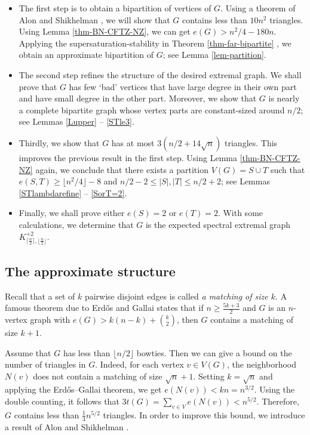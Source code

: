\documentclass[11pt]{article}
\begin{document}
\begin{itemize}

\item[\ding{172}]
The first step is to obtain a bipartition of  vertices of $G$. 
Using a theorem of Alon and Shikhelman \cite{AS2016}, 
we will show that $G$ 
contains less than $10n^{2}$ triangles. 
Using Lemma \ref{thm-BN-CFTZ-NZ}, 
we can get $e(G) > {n^2}/{4} - 180n$. 
Applying the supersaturation-stability in Theorem \ref{thm-far-bipartite} , 
we obtain an approximate bipartition of $G$; see Lemma \ref{lem-partition}. 


\item[\ding{173}]
The second step refines the structure of 
the desired extremal graph. 
We shall prove that $G$ has  few `bad' vertices that have large degree in their own part and have small degree in the other part.    
Moreover, we show 
 that $G$ is nearly a complete bipartite graph whose vertex parts are constant-sized around ${n}/{2}$; see Lemmas \ref{Lupper} --  \ref{STle3}. 


\item[\ding{174}] 
Thirdly, we show that $G$ has at most 
$3({n}/{2} + 14\sqrt{n})$ triangles. 
This improves the previous result in the first step. 
Using Lemma \ref{thm-BN-CFTZ-NZ} again,  
we conclude that there exists a partition $V(G)=S\cup T$ such that 
$e(S,T)\ge \lfloor n^2/4\rfloor -8$ and ${n}/{2} -2 \le 
|S|, |T| \le {n}/{2} +2$; see Lemmas \ref{STlambdarefine} --  \ref{SorT=2}. 

\item[\ding{175}]
Finally, 
we shall prove either $e(S)=2$ or $e(T)=2$.  
With some calculations, we  determine that 
$G$ is the expected spectral extremal graph $K_{\lceil \frac{n}{2} \rceil, \lfloor \frac{n}{2} \rfloor}^{+2}$. 
\end{itemize}



\subsection{The approximate structure}



Recall that a set of $k$ pairwise disjoint edges is 
called {\it a matching of size $k$}.  
A famous theorem due to Erd\H{o}s and Gallai \cite{EG1959}  
states that if $n\ge \frac{5k+3}{2}$ and 
$G$ is an $n$-vertex graph with $e(G) > k(n-k) +{k \choose 2}$, 
then $G$ contains a  matching of size $k+1$. 

\medskip 
Assume that $G$ has less than  
$\lfloor {n}/{2}\rfloor $ bowties. 
Then we can give a bound on the number of triangles in $G$. 
Indeed, for each vertex $v\in V(G)$, 
the neighborhood $N(v)$ does not contain 
a matching of size $\sqrt{n} +1$.  
Setting $k=\sqrt{n}$ and applying the Erd\H{o}s--Gallai theorem, we get 
 $e(N(v)) < kn =n^{3/2}$. 
Using the double counting, it follows that 
$  3t(G) = \sum_{v\in V} e(N(v))  <  n^{5/2}$.  
Therefore, $G$ contains less than $\frac{1}{3}n^{5/2}$ triangles.  
In order to improve this bound, we introduce a 
result of Alon and Shikhelman \cite[Lemma 3.1]{AS2016}. 
\end{document}
